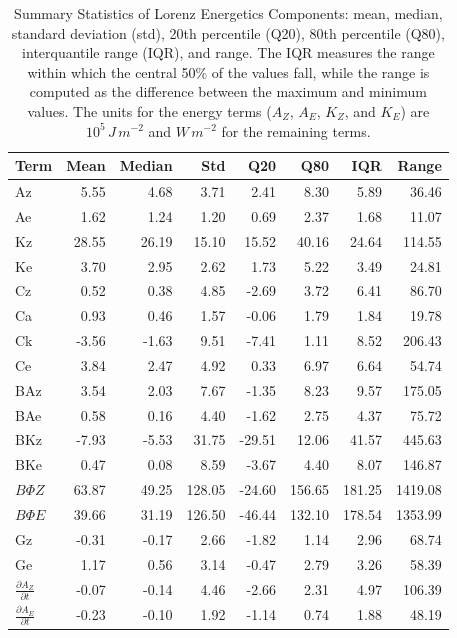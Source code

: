 \begin{table}[!htbp]
\centering
\caption[Summary Statistics of Lorenz Energetics Components]{Summary Statistics of Lorenz Energetics Components: mean, median, standard deviation (std), 20th percentile (Q20), 80th percentile (Q80), interquantile range (IQR), and range. The IQR measures the range within which the central 50\% of the values fall, while the range is computed as the difference between the maximum and minimum values. The units for the energy terms ($A_Z$, $A_E$, $K_Z$, and $K_E$) are $10^5 \, J \, m^{-2}$ and $W \, m^{-2}$ for the remaining terms.}
\label{tab:lec_stats}
\begin{tabular}{lrrrrrrr}
\toprule
Term & Mean & Median & Std & Q20 & Q80 & IQR & Range \\
\midrule
Az & 5.55 & 4.68 & 3.71 & 2.41 & 8.30 & 5.89 & 36.46 \\
Ae & 1.62 & 1.24 & 1.20 & 0.69 & 2.37 & 1.68 & 11.07 \\
Kz & 28.55 & 26.19 & 15.10 & 15.52 & 40.16 & 24.64 & 114.55 \\
Ke & 3.70 & 2.95 & 2.62 & 1.73 & 5.22 & 3.49 & 24.81 \\
Cz & 0.52 & 0.38 & 4.85 & -2.69 & 3.72 & 6.41 & 86.70 \\
Ca & 0.93 & 0.46 & 1.57 & -0.06 & 1.79 & 1.84 & 19.78 \\
Ck & -3.56 & -1.63 & 9.51 & -7.41 & 1.11 & 8.52 & 206.43 \\
Ce & 3.84 & 2.47 & 4.92 & 0.33 & 6.97 & 6.64 & 54.74 \\
BAz & 3.54 & 2.03 & 7.67 & -1.35 & 8.23 & 9.57 & 175.05 \\
BAe & 0.58 & 0.16 & 4.40 & -1.62 & 2.75 & 4.37 & 75.72 \\
BKz & -7.93 & -5.53 & 31.75 & -29.51 & 12.06 & 41.57 & 445.63 \\
BKe & 0.47 & 0.08 & 8.59 & -3.67 & 4.40 & 8.07 & 146.87 \\
$B\Phi Z$ & 63.87 & 49.25 & 128.05 & -24.60 & 156.65 & 181.25 & 1419.08 \\
$B\Phi E$ & 39.66 & 31.19 & 126.50 & -46.44 & 132.10 & 178.54 & 1353.99 \\
Gz & -0.31 & -0.17 & 2.66 & -1.82 & 1.14 & 2.96 & 68.74 \\
Ge & 1.17 & 0.56 & 3.14 & -0.47 & 2.79 & 3.26 & 58.39 \\
$\frac{\partial A_Z}{\partial t}$ & -0.07 & -0.14 & 4.46 & -2.66 & 2.31 & 4.97 & 106.39 \\
$\frac{\partial A_E}{\partial t}$ & -0.23 & -0.10 & 1.92 & -1.14 & 0.74 & 1.88 & 48.19 \\

\end{tabular}
\end{table}
